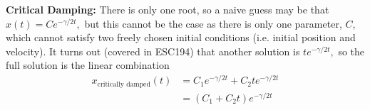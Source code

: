 \documentclass{article}
\begin{document}
\textbf{Critical Damping:} There is only one root, so a naive guess may be that $x(t) = Ce^{-\gamma/2 t},$ but this cannot be the case as there is only one parameter, $C$, which cannot satisfy two freely chosen initial conditions (i.e. initial position and velocity). It turns out (covered in ESC194) that another solution is $te^{-\gamma/2 t},$ so the full solution is the linear combination 
\begin{align}
    x_\text{critically damped}(t) &= C_1e^{-\gamma/2 t} + C_2te^{-\gamma/2 t} \\ 
    &= (C_1+C_2t)e^{-\gamma/2 t}
\end{align} 
\end{document}
